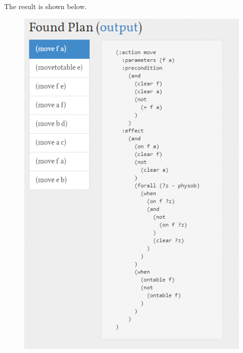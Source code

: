 ﻿\documentclass[a4paper, 11pt]{article}
\begin{document}
The result is shown below.
\begin{figure}[H]
\centering
\includegraphics[width=0.5\linewidth]{fig/result2.png}
\end{figure}
\end{document}
